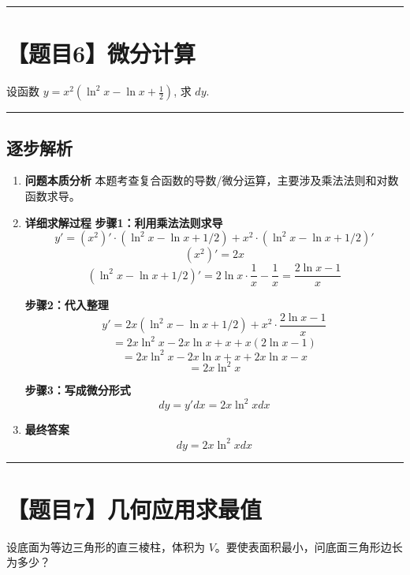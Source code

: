 \documentclass[12pt, a4paper]{article}
\newenvironment{redenv}{\color{red}}{}
\newenvironment{detailedanalysis}{%
    \color{red}
    \begin{enumerate}[label=\textbf{第\arabic*步：}, leftmargin=*, align=left, itemsep=1.5ex]
}{%
    \end{enumerate}
}
\newcommand{\problemrule}{\noindent\rule{\textwidth}{1.5pt}\vspace{-0.8em}}
\newcommand{\analysisrule}{\noindent\rule{\textwidth}{0.8pt}\vspace{-0.8em}}
\begin{document}
\problemrule
\section*{【题目6】微分计算}
设函数 $y = x^2 \left( \ln^2 x - \ln x + \frac{1}{2} \right)$, 求 $dy$.

\begin{redenv}
\analysisrule
\subsection*{逐步解析}

\begin{detailedanalysis}
\item \textbf{问题本质分析}
本题考查复合函数的导数/微分运算，主要涉及乘法法则和对数函数求导。

\item \textbf{详细求解过程}
\textbf{步骤1：利用乘法法则求导}
\[ y' = (x^2)' \cdot (\ln^2 x - \ln x + 1/2) + x^2 \cdot (\ln^2 x - \ln x + 1/2)' \]
\[ (x^2)' = 2x \]
\[ (\ln^2 x - \ln x + 1/2)' = 2\ln x \cdot \frac{1}{x} - \frac{1}{x} = \frac{2\ln x - 1}{x} \]

\textbf{步骤2：代入整理}
\[ y' = 2x(\ln^2 x - \ln x + 1/2) + x^2 \cdot \frac{2\ln x - 1}{x} \]
\[ = 2x\ln^2 x - 2x\ln x + x + x(2\ln x - 1) \]
\[ = 2x\ln^2 x - 2x\ln x + x + 2x\ln x - x \]
\[ = 2x\ln^2 x \]

\textbf{步骤3：写成微分形式}
\[ dy = y' dx = 2x \ln^2 x dx \]

\item \textbf{最终答案}
\[ dy = 2x \ln^2 x dx \]
\end{detailedanalysis}
\end{redenv}


\problemrule
\section*{【题目7】几何应用求最值}
设底面为等边三角形的直三棱柱，体积为 $V$。要使表面积最小，问底面三角形边长为多少？
\end{document}
